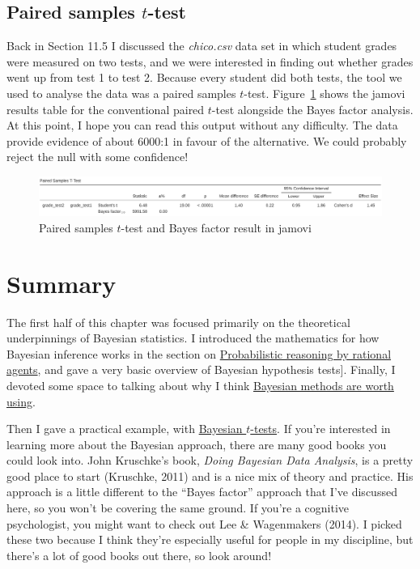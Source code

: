 \documentclass[
  a4paper,
]{book}
\begin{document}
\hypertarget{paired-samples-t-test}{%
\subsection{\texorpdfstring{Paired samples
\(t\)-test}{Paired samples t-test}}\label{paired-samples-t-test}}

Back in Section 11.5 I discussed the \emph{chico.csv} data set in which
student grades were measured on two tests, and we were interested in
finding out whether grades went up from test 1 to test 2. Because every
student did both tests, the tool we used to analyse the data was a
paired samples \(t\)-test. Figure~\ref{fig-fig16-4} shows the jamovi
results table for the conventional paired \(t\)-test alongside the Bayes
factor analysis. At this point, I hope you can read this output without
any difficulty. The data provide evidence of about 6000:1 in favour of
the alternative. We could probably reject the null with some confidence!

\begin{figure}

\includegraphics[width=1\textwidth,height=\textheight]{images/fig16-4.png} \hfill{}

\caption{\label{fig-fig16-4}Paired samples \(t\)-test and Bayes factor
result in jamovi}

\end{figure}

\hypertarget{summary-1}{%
\section{Summary}\label{summary-1}}

The first half of this chapter was focused primarily on the theoretical
underpinnings of Bayesian statistics. I introduced the mathematics for
how Bayesian inference works in the section on
\protect\hyperlink{probabilistic-reasoning-by-rational-agents}{Probabilistic
reasoning by rational agents}, and gave a very basic overview of
Bayesian hypothesis tests{]}. Finally, I devoted some space to talking
about why I think \href{Why\%20be\%20a\%20Bayesian?}{Bayesian methods
are worth using}.

Then I gave a practical example, with
\protect\hyperlink{bayesian-t-tests}{Bayesian \(t\)-tests}. If you're
interested in learning more about the Bayesian approach, there are many
good books you could look into. John Kruschke's book, \emph{Doing
Bayesian Data Analysis}, is a pretty good place to start (Kruschke,
2011) and is a nice mix of theory and practice. His approach is a little
different to the ``Bayes factor'' approach that I've discussed here, so
you won't be covering the same ground. If you're a cognitive
psychologist, you might want to check out Lee \& Wagenmakers (2014). I
picked these two because I think they're especially useful for people in
my discipline, but there's a lot of good books out there, so look
around!
\end{document}
